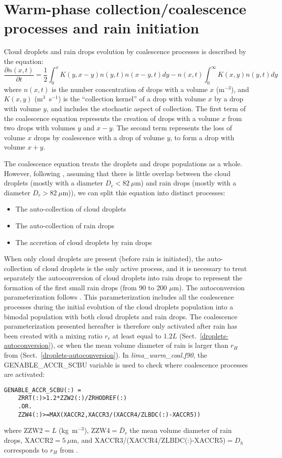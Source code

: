\section{Warm-phase collection/coalescence processes and rain initiation}

Cloud droplets and rain drops evolution by coalescence processes is described by the equation:
\begin{equation}
 \frac{\partial n(x,t)}{\partial t} = \frac{1}{2} \int_0^x K(y,x-y)n(y,t)n(x-y,t)dy - n(x,t) \int_0^\infty K(x,y)n(y,t)dy
\end{equation}
where $n(x,t)$ is the number concentration of drops with a volume $x$ (m$^{-3}$), and $K(x,y)$ (m$^3$~s$^{-1}$) is the ``collection kernel'' of a drop with volume $x$ by a drop with volume $y$, and includes the stochastic aspect of collection. The first term of the coalescence equation represents the creation of drops with a volume $x$ from two drops with volumes $y$ and $x-y$. The second term represents the loss of volume $x$ drops by coalescence with a drop of volume $y$, to form a drop with volume $x+y$.

The coalescence equation treats the droplets and drops populations as a whole. However, following \citet{Cohard2000c2r2}, assuming that there is little overlap between the cloud droplets (mostly with a diameter $D_c < 82~\mu$m) and rain drops (mostly with a diameter $D_r > 82~\mu$m)), we can split this equation into distinct processes:
\begin{itemize}
 \item The auto-collection of cloud droplets
 \item The auto-collection of rain drops
 \item The accretion of cloud droplets by rain drops
\end{itemize}

When only cloud droplets are present (before rain is initiated), the auto-collection of cloud droplets is the only active process, and it is necessary to treat separately the autoconversion of cloud droplets into rain drops to represent the formation of the first small rain drops (from 90 to 200 $\mu$m). The autoconversion parameterization follows \citet{Berry1974}. This parameterization includes all the coalescence processes during the initial evolution of the cloud droplets population into a bimodal population with both cloud droplets and rain drops. The coalescence parameterization presented hereafter is therefore only activated after rain has been created with a mixing ratio $r_r$ at least equal to $1.2 L$ (Sect.\ \ref{droplets-autoconversion}), or when the mean volume diameter of rain is larger than $r_H$ from \citet{Berry1974} (Sect.\ \ref{droplets-autoconversion}). In \emph{lima\_warm\_coal.f90}, the GENABLE\_ACCR\_SCBU variable is used to check where coalescence processes are activated:
\begin{lstlisting}[frame=single]
 GENABLE_ACCR_SCBU(:) = 
 	ZRRT(:)>1.2*ZZW2(:)/ZRHODREF(:)
 	.OR.
	ZZW4(:)>=MAX(XACCR2,XACCR3/(XACCR4/ZLBDC(:)-XACCR5))
\end{lstlisting}
where ZZW2$=L$ (kg~m$^{-3}$), ZZW4$=\bar{D}_r$ the mean volume diameter of rain drops, XACCR2$=5~\mu$m, and XACCR3/(XACCR4/ZLBDC(:)-XACCR5)$=D_h$ corresponds to $r_H$ from \citet{Berry1974}.

